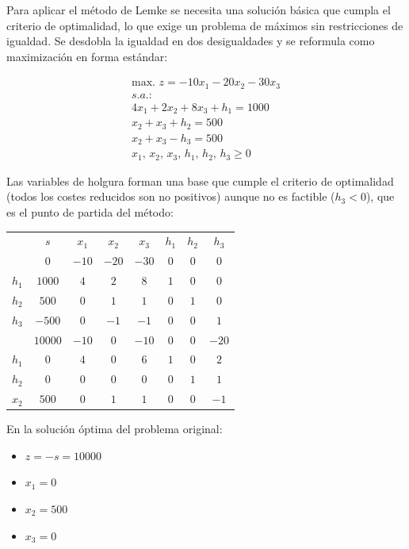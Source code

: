 Para aplicar el método de Lemke se necesita una solución básica que cumpla el criterio de optimalidad, lo que exige un problema de máximos sin restricciones de igualdad. Se desdobla la igualdad en dos desigualdades y se reformula como maximización en forma estándar:

\begin{equation}
\begin{split}
\mbox{max. } z = -10x_1 - 20x_2 - 30x_3\\
s.a.:\\
4x_1 + 2x_2 + 8x_3 + h_1 = 1000\\
x_2 + x_3 + h_2 = 500\\
x_2 + x_3 - h_3 = 500\\
x_1,\,x_2,\,x_3,\,h_1,\,h_2,\,h_3\geq 0
\end{split}
\end{equation}

Las variables de holgura forman una base que cumple el criterio de optimalidad (todos los costes reducidos son no positivos) aunque no es factible ($h_3 < 0$), que es el punto de partida del método:

\begin{center}
\begin{tabular}{c|c|cccccc|}
  & $s$ & $x_1$ & $x_2$ & $x_3$ & $h_1$ & $h_2$ & $h_3$\\
 & $0$ & $-10$ & $-20$ & $-30$ & $0$ & $0$ & $0$\\
\hline
$h_1$ & $1000$ & $4$ & $2$ & $8$ & $1$ & $0$ & $0$\\
$h_2$ & $500$ & $0$ & $1$ & $1$ & $0$ & $1$ & $0$\\
$h_3$ & $-500$ & $0$ & $-1$ & $-1$ & $0$ & $0$ & $1$\\
\hline
 & $10000$ & $-10$ & $0$ & $-10$ & $0$ & $0$ & $-20$\\
\hline
$h_1$ & $0$ & $4$ & $0$ & $6$ & $1$ & $0$ & $2$\\
$h_2$ & $0$ & $0$ & $0$ & $0$ & $0$ & $1$ & $1$\\
$x_2$ & $500$ & $0$ & $1$ & $1$ & $0$ & $0$ & $-1$\\
\hline
\end{tabular}
\end{center}

En la solución óptima del problema original:

\begin{itemize}
    \item $z = -s = 10000$
    \item $x_1 = 0$
    \item $x_2 = 500$
    \item $x_3 = 0$
\end{itemize}
